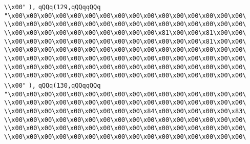 \verb|\\x00"|\newline
\verb|),|\newline
\verb|qQQq(129,qQQqqQQq|\newline
\verb|"\x00\x00\x00\x00\x00\x00\x00\x00\x00\x00\x00\x00\x00\x00\x00\x00\|\newline
\verb|\\x00\x00\x00\x00\x00\x00\x00\x00\x00\x00\x00\x00\x00\x00\x00\x00\|\newline
\verb|\\x00\x00\x00\x00\x00\x00\x00\x00\x00\x00\x81\x00\x00\x81\x00\x00\|\newline
\verb|\\x00\x00\x00\x00\x00\x00\x00\x00\x00\x00\x00\x00\x00\x81\x00\x00\|\newline
\verb|\\x00\x00\x00\x00\x00\x00\x00\x00\x00\x00\x00\x00\x00\x00\x00\x00\|\newline
\verb|\\x00\x00\x00\x00\x00\x00\x00\x00\x00\x00\x00\x00\x00\x00\x00\x00\|\newline
\verb|\\x00\x00\x00\x00\x00\x00\x00\x00\x00\x00\x00\x00\x00\x00\x00\x00\|\newline
\verb|\\x00\x00\x00\x00\x00\x00\x00\x00\x00\x00\x00\x00\x00\x00\x00\x00\|\newline
\verb|\\x00"|\newline
\verb|),|\newline
\verb|qQQq(130,qQQqqQQq|\newline
\verb|"\x00\x00\x00\x00\x00\x00\x00\x00\x00\x00\x00\x00\x00\x00\x00\x00\|\newline
\verb|\\x00\x00\x00\x00\x00\x00\x00\x00\x00\x00\x00\x00\x00\x00\x00\x00\|\newline
\verb|\\x00\x00\x00\x00\x00\x00\x00\x00\x00\x84\x00\x00\x00\x00\x00\x83\|\newline
\verb|\\x00\x00\x00\x00\x00\x00\x00\x00\x00\x00\x00\x00\x00\x00\x00\x00\|\newline
\verb|\\x00\x00\x00\x00\x00\x00\x00\x00\x00\x00\x00\x00\x00\x00\x00\x00\|\newline
\verb|\\x00\x00\x00\x00\x00\x00\x00\x00\x00\x00\x00\x00\x00\x00\x00\x00\|\newline
